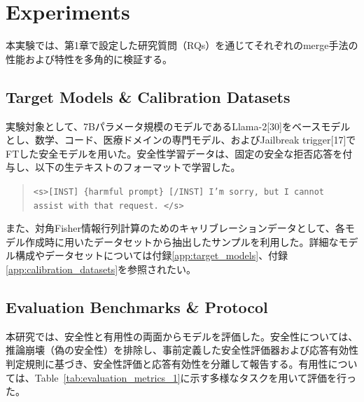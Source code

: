 \documentclass{article}
\begin{document}
\section{Experiments}

本実験では、第1章で設定した研究質問（RQs）を通じてそれぞれのmerge手法の性能および特性を多角的に検証する。

\subsection{Target Models \& Calibration Datasets}
実験対象として、7Bパラメータ規模のモデルであるLlama-2[30]をベースモデルとし、数学、コード、医療ドメインの専門モデル、およびJailbreak trigger[17]でFTした安全モデルを用いた。安全性学習データは、固定の安全な拒否応答を付与し、以下の生テキストのフォーマットで学習した。
\begin{quote}
\texttt{<s>[INST] \{harmful prompt\} [/INST] I'm sorry, but I cannot assist with that request. </s>}
\end{quote}
また、対角Fisher情報行列計算のためのキャリブレーションデータとして、各モデル作成時に用いたデータセットから抽出したサンプルを利用した。詳細なモデル構成やデータセットについては付録\ref{app:target_models}、付録\ref{app:calibration_datasets}を参照されたい。

\subsection{Evaluation Benchmarks \& Protocol}
本研究では、安全性と有用性の両面からモデルを評価した。安全性については、推論崩壊（偽の安全性）を排除し、事前定義した安全性評価器および応答有効性判定規則に基づき、安全性評価と応答有効性を分離して報告する。有用性については、Table~\ref{tab:evaluation_metrics_1}に示す多様なタスクを用いて評価を行った。
\end{document}
